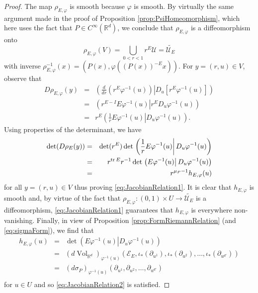 \documentclass[11pt]{article}
\theoremstyle{remark}
\renewcommand\det{\operatorname{det}}
\newcommand{\Vol}{\operatorname{Vol}}
\begin{document}
\begin{proof}
The map $\rho_{E,\varphi}$ is smooth because $\varphi$ is smooth. By virtually the same argument made in the proof of Proposition \ref{prop:PsiHomeomorphism}, which here uses the fact that $P\in C^\infty(\mathbb{R}^d)$, we conclude that $\rho_{E,\varphi}$ is a diffeomorphism onto 
\begin{equation*}\rho_{E,\varphi}(V)=\bigcup_{0<r<1}r^E\mathcal{U}=\widetilde{\mathcal{U}_E}
\end{equation*}
with inverse $\rho_{E,\varphi}^{-1}(x)=(P(x),\varphi((P(x))^{-E}x))$. For $y=(r,u)\in V$, observe that
\begin{eqnarray*}
D\rho_{E,\varphi}(y)&=&\left.\left(\frac{d}{dr}(r^E\varphi^{-1}(u)) \right\vert D_u\left[r^E\varphi^{-1}(u)\right]\right)\\
&=&\left.\left(r^{E-I}E\varphi^{-1}(u)\right\vert r^E D_u\varphi^{-1}(u)\right)\\
&=&r^E\left.\left(\frac{1}{r}E\varphi^{-1}(u)\right\vert D_u\varphi^{-1}(u)\right).
\end{eqnarray*}
Using properties of the determinant, we have
\begin{eqnarray*}
    \det(D\rho_E(y))&=&\det(r^E)\det\left.\left(\frac{1}{r}E\varphi^{-1}(u)\right\vert D_u\varphi^{-1}(u)\right)\\
    &=&r^{\tr E}r^{-1}\det\left.\left(E\varphi^{-1}(u)\right\vert D_u\varphi^{-1}(u)\right)\\
    &=&r^{\mu_P-1}h_{E,\varphi}(u)
\end{eqnarray*}
for all $y=(r,u)\in V$ thus proving \eqref{eq:JacobianRelation1}. It is clear that $h_{E,\varphi}$ is smooth and, by virtue of the fact that $\rho_{E,\varphi}:(0,1)\times U\to \widetilde{\mathcal{U}_E}$ is a diffeomorphism, \eqref{eq:JacobianRelation1} guarantees that $h_{E,\varphi}$ is everywhere non-vanishing. Finally, 
in view of Proposition \ref{prop:FormRiemannRelation} (and \eqref{eq:sigmaForm}), we find that
\begin{eqnarray*}
    h_{E,\varphi}(u)&=&
    \det\left.\left(E\varphi^{-1}(u)\right\vert D_u\varphi^{-1}(u)\right)\\ \nonumber
    &=&
    (d\Vol_{\mathbb{R}^d})_{\varphi^{-1}(u)}(\mathcal{E}_E,\iota_*(\partial_{u^1}),\iota_*(\partial_{u^2}),\dots,\iota_*(\partial_{u^{d'}}))\\ \nonumber
    &=&\left(d\sigma_P\right)_{\varphi^{-1}(u)}(\partial_{u^1},\partial_{u^2},\dots,\partial_{u^{d'}})\\
\end{eqnarray*}
for $u\in U$ and so \eqref{eq:JacobianRelation2} is satisfied.
\end{proof}
\end{document}
